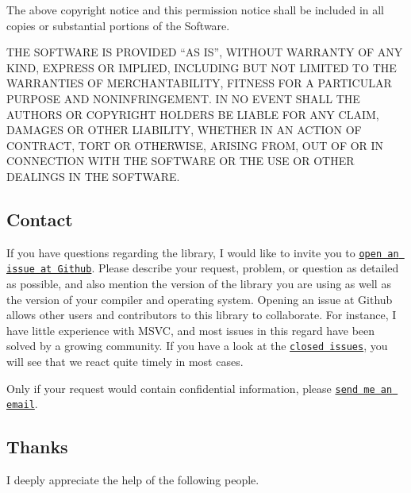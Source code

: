 The above copyright notice and this permission notice shall be included in all copies or substantial portions of the Software.

T\+HE S\+O\+F\+T\+W\+A\+RE IS P\+R\+O\+V\+I\+D\+ED “\+AS I\+S”, W\+I\+T\+H\+O\+UT W\+A\+R\+R\+A\+N\+TY OF A\+NY K\+I\+ND, E\+X\+P\+R\+E\+SS OR I\+M\+P\+L\+I\+ED, I\+N\+C\+L\+U\+D\+I\+NG B\+UT N\+OT L\+I\+M\+I\+T\+ED TO T\+HE W\+A\+R\+R\+A\+N\+T\+I\+ES OF M\+E\+R\+C\+H\+A\+N\+T\+A\+B\+I\+L\+I\+TY, F\+I\+T\+N\+E\+SS F\+OR A P\+A\+R\+T\+I\+C\+U\+L\+AR P\+U\+R\+P\+O\+SE A\+ND N\+O\+N\+I\+N\+F\+R\+I\+N\+G\+E\+M\+E\+NT. IN NO E\+V\+E\+NT S\+H\+A\+LL T\+HE A\+U\+T\+H\+O\+RS OR C\+O\+P\+Y\+R\+I\+G\+HT H\+O\+L\+D\+E\+RS BE L\+I\+A\+B\+LE F\+OR A\+NY C\+L\+A\+IM, D\+A\+M\+A\+G\+ES OR O\+T\+H\+ER L\+I\+A\+B\+I\+L\+I\+TY, W\+H\+E\+T\+H\+ER IN AN A\+C\+T\+I\+ON OF C\+O\+N\+T\+R\+A\+CT, T\+O\+RT OR O\+T\+H\+E\+R\+W\+I\+SE, A\+R\+I\+S\+I\+NG F\+R\+OM, O\+UT OF OR IN C\+O\+N\+N\+E\+C\+T\+I\+ON W\+I\+TH T\+HE S\+O\+F\+T\+W\+A\+RE OR T\+HE U\+SE OR O\+T\+H\+ER D\+E\+A\+L\+I\+N\+GS IN T\+HE S\+O\+F\+T\+W\+A\+RE.

\subsection*{Contact}

If you have questions regarding the library, I would like to invite you to \href{https://github.com/nlohmann/json/issues/new}{\tt open an issue at Github}. Please describe your request, problem, or question as detailed as possible, and also mention the version of the library you are using as well as the version of your compiler and operating system. Opening an issue at Github allows other users and contributors to this library to collaborate. For instance, I have little experience with M\+S\+VC, and most issues in this regard have been solved by a growing community. If you have a look at the \href{https://github.com/nlohmann/json/issues?q=is%3Aissue+is%3Aclosed}{\tt closed issues}, you will see that we react quite timely in most cases.

Only if your request would contain confidential information, please \href{mailto:mail@nlohmann.me}{\tt send me an email}.

\subsection*{Thanks}

I deeply appreciate the help of the following people.


